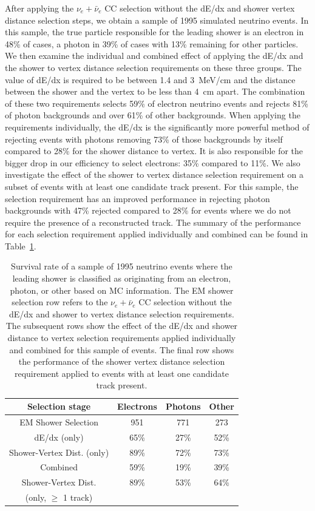 After applying the $\nu_e+\bar{\nu}_e$ CC selection without the dE/dx and shower vertex distance selection steps, we obtain a sample of 1995 simulated neutrino events. In this sample, the true particle responsible for the leading shower is an electron in 48\% of cases, a photon in 39\% of cases with 13\% remaining for other particles. We then examine the individual and combined effect of applying the dE/dx and the shower to vertex distance selection requirements on these three groups. The value of dE/dx is required to be between 1.4 and 3~MeV/cm and the distance between the shower and the vertex to be less than 4~cm apart. The combination of these two requirements selects 59\% of electron neutrino events and rejects 81\% of photon backgrounds and over 61\% of other backgrounds. When applying the requirements individually, the dE/dx is the significantly more powerful method of rejecting events with photons removing 73\% of those backgrounds by itself compared to 28\% for the shower distance to vertex. It is also responsible for the bigger drop in our efficiency to select electrons: 35\% compared to 11\%. We also investigate the effect of the shower to vertex distance selection requirement on a subset of events with at least one candidate track present. For this sample, the selection requirement has an improved performance in rejecting photon backgrounds with 47\% rejected compared to 28\% for events where we do not require the presence of a reconstructed track. The summary of the performance for each selection requirement applied individually and combined can be found in Table~\ref{tab:ele-phot}.


\begin{table}[htb]
\center
\caption{Survival rate of a sample of 1995 neutrino events where the leading shower is classified as originating from an electron, photon, or other based on MC information. The EM shower selection row refers to the $\nu_e+\bar{\nu}_e$ CC selection without the dE/dx and shower to vertex distance selection requirements. The subsequent rows show the effect of the dE/dx and shower distance to vertex selection requirements applied individually and combined for this sample of events. The final row shows the performance of the shower vertex distance selection requirement applied to events with at least one candidate track present. \label{tab:ele-phot}}
\begin{tabular}{c  c  c  c  } 
\hline
\hline
Selection stage & Electrons & Photons & Other \\
\hline
EM Shower Selection & 951 & 771 & 273  \\
dE/dx (only) & 65\%  &  27\% & 52\%  \\
Shower-Vertex Dist. (only) & 89\% & 72\% & 73\% \\
Combined & 59\% & 19\% & 39\% \\
\hline
Shower-Vertex Dist.  & 89\% & 53\% & 64\% \\
(only, $\geq$ 1 track) & & & \\
\hline
\hline
\end{tabular}
\end{table}


